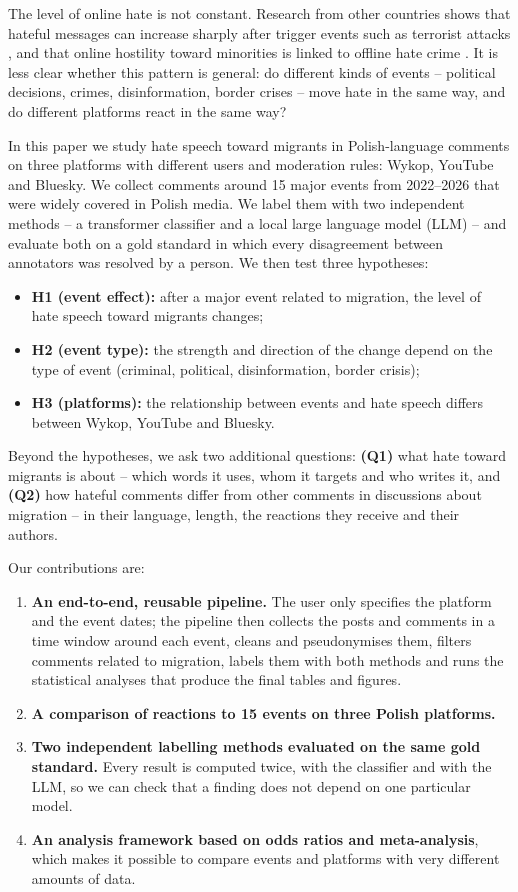 \documentclass[11pt]{article}
\begin{document}
The level of online hate is not constant. Research from other countries shows that hateful messages can increase sharply after trigger events such as terrorist attacks \citep{williams2016,olteanu2018}, and that online hostility toward minorities is linked to offline hate crime \citep{muller2021}. It is less clear whether this pattern is general: do different kinds of events -- political decisions, crimes, disinformation, border crises -- move hate in the same way, and do different platforms react in the same way?

In this paper we study hate speech toward migrants in Polish-language comments on three platforms with different users and moderation rules: Wykop, YouTube and Bluesky. We collect comments around 15 major events from 2022--2026 that were widely covered in Polish media. We label them with two independent methods -- a transformer classifier and a local large language model (LLM) -- and evaluate both on a gold standard in which every disagreement between annotators was resolved by a person. We then test three hypotheses:

\begin{itemize}
  \item \textbf{H1 (event effect):} after a major event related to migration, the level of hate speech toward migrants changes;
  \item \textbf{H2 (event type):} the strength and direction of the change depend on the type of event (criminal, political, disinformation, border crisis);
  \item \textbf{H3 (platforms):} the relationship between events and hate speech differs between Wykop, YouTube and Bluesky.
\end{itemize}

\noindent Beyond the hypotheses, we ask two additional questions: \textbf{(Q1)} what hate toward migrants is about -- which words it uses, whom it targets and who writes it, and \textbf{(Q2)} how hateful comments differ from other comments in discussions about migration -- in their language, length, the reactions they receive and their authors.

Our contributions are:
\begin{enumerate}
  \item \textbf{An end-to-end, reusable pipeline.} The user only specifies the platform and the event dates; the pipeline then collects the posts and comments in a time window around each event, cleans and pseudonymises them, filters comments related to migration, labels them with both methods and runs the statistical analyses that produce the final tables and figures.
  \item \textbf{A comparison of reactions to 15 events on three Polish platforms.}
  \item \textbf{Two independent labelling methods evaluated on the same gold standard.} Every result is computed twice, with the classifier and with the LLM, so we can check that a finding does not depend on one particular model.
  \item \textbf{An analysis framework based on odds ratios and meta-analysis}, which makes it possible to compare events and platforms with very different amounts of data.
\end{enumerate}
\end{document}
